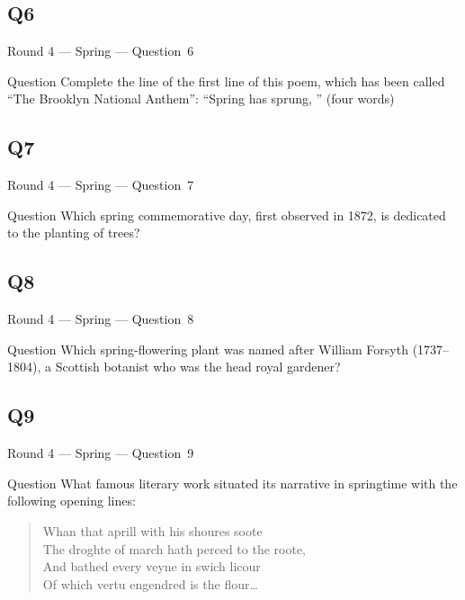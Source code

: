 \documentclass[11pt]{beamer}
\begin{document}
\subsection*{Q6}
\begin{frame}[t]{Round 4 --- Spring --- \mbox{Question 6}}
\vspace{-0.5em}
\begin{block}{Question}
Complete the line of the first line of this poem, which has been called ``The Brooklyn National Anthem'': ``Spring has sprung, \textunderscore{}\textunderscore{}\textunderscore{}\textunderscore{}\textunderscore{} \textunderscore{}\textunderscore{}\textunderscore{}\textunderscore{}\textunderscore{} \textunderscore{}\textunderscore{}\textunderscore{}\textunderscore{}\textunderscore{} \textunderscore{}\textunderscore{}\textunderscore{}\textunderscore{}\textunderscore{}'' (four words)
\end{block}
\end{frame}
\subsection*{Q7}
\begin{frame}[t]{Round 4 --- Spring --- \mbox{Question 7}}
\vspace{-0.5em}
\begin{block}{Question}
Which spring commemorative day, first observed in 1872, is dedicated to the planting of trees?
\end{block}
\end{frame}
\subsection*{Q8}
\begin{frame}[t]{Round 4 --- Spring --- \mbox{Question 8}}
\vspace{-0.5em}
\begin{block}{Question}
Which spring-flowering plant was named after  William Forsyth (1737--1804), a Scottish botanist who was the head royal gardener?
\end{block}
\end{frame}
\subsection*{Q9}
\begin{frame}[t]{Round 4 --- Spring --- \mbox{Question 9}}
\vspace{-0.5em}
\begin{block}{Question}
What famous literary work situated its narrative in springtime with the following opening lines:
\begin{quotation}
Whan that aprill with his shoures soote\\
The droghte of march hath perced to the roote,\\
And bathed every veyne in swich licour\\
Of which vertu engendred is the flour\ldots
\end{quotation}
\end{block}
\end{frame}
\end{document}
